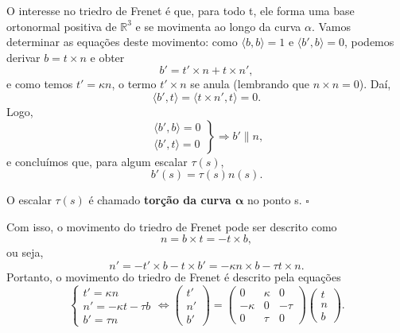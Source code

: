 \documentclass[../differential_geometry.tex]{subfiles}
\begin{document}
O interesse no triedro de Frenet é que, para todo t, ele forma uma base ortonormal positiva de \(\mathbb{R}^{3}\) e se movimenta ao longo da curva \(\alpha \).
Vamos determinar as equações deste movimento: como \(\langle b, b \rangle=1\) e \(\langle b', b \rangle=0\), podemos derivar \(b=t \times n\) e obter
\[
	b'= t' \times n + t \times n',
\]
e como temos \(t'=\kappa n\), o termo \(t' \times n \) se anula (lembrando que \(n \times n=0\)). Daí,
\[
	\langle b', t \rangle = \langle t \times n', t \rangle=0.
\]
Logo,
\[
	\left.\begin{array}{ll}
		\langle b', b \rangle=0 \\
		\langle b', t \rangle=0
	\end{array}\right\} \Rightarrow b'\parallel n,
\]
e concluímos que, para algum escalar \(\tau (s)\),
\[
	b'(s)=\tau (s)n(s).
\]
\begin{def*}
	O escalar \(\tau (s)\) é chamado \textbf{torção da curva \(\mathbf{\alpha }\)} no ponto s. \(\square\)
\end{def*}

Com isso, o movimento do triedro de Frenet pode ser descrito como
\[
	n = b \times t = -t \times b,
\]
ou seja,
\[
	n'=-t'\times b-t \times b'=-\kappa n \times b-\tau t \times n.
\]
Portanto, o movimento do triedro de Frenet é descrito pela equações
\[
	\left\{\begin{array}{ll}
		t'=\kappa n           \\
		n'=-\kappa t - \tau b \\
		b'=\tau n
	\end{array}\right. \Longleftrightarrow \begin{pmatrix}
		t' \\
		n' \\
		b'
	\end{pmatrix} = \begin{pmatrix}
		0       & \kappa & 0     \\
		-\kappa & 0      & -\tau \\
		0       & \tau   & 0
	\end{pmatrix} \begin{pmatrix}
		t \\
		n \\
		b
	\end{pmatrix}.
\]
\end{document}
